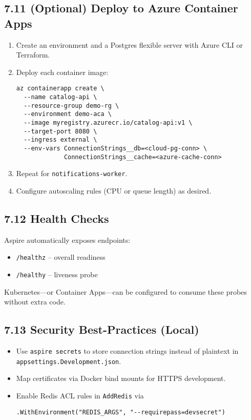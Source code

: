 \documentclass[table]{article}
\begin{document}
\subsection*{7.11 \faGlobe\enspace (Optional) Deploy to Azure Container Apps}
\begin{enumerate}
  \item Create an environment and a Postgres flexible server with
        Azure CLI or Terraform.
  \item Deploy each container image:
\begin{verbatim}
az containerapp create \
  --name catalog-api \
  --resource-group demo-rg \
  --environment demo-aca \
  --image myregistry.azurecr.io/catalog-api:v1 \
  --target-port 8080 \
  --ingress external \
  --env-vars ConnectionStrings__db=<cloud-pg-conn> \
             ConnectionStrings__cache=<azure-cache-conn>
\end{verbatim}
  \item Repeat for \texttt{notifications-worker}.  
  \item Configure autoscaling rules (CPU or queue length) as desired.
\end{enumerate}

\subsection*{7.12 \faHeartbeat\enspace Health Checks}
Aspire automatically exposes endpoints:
\begin{itemize}
  \item \verb|/healthz| – overall readiness
  \item \verb|/healthy| – liveness probe
\end{itemize}
Kubernetes—or Container Apps—can be configured to consume these probes
without extra code.

\subsection*{7.13 \faCubes\enspace Security Best-Practices (Local)}
\begin{itemize}
  \item Use \verb|aspire secrets| to store connection strings instead
        of plaintext in \verb|appsettings.Development.json|.
  \item Map certificates via Docker bind mounts for HTTPS development.
  \item Enable Redis ACL rules in \verb|AddRedis| via
\begin{verbatim}
.WithEnvironment("REDIS_ARGS", "--requirepass=devsecret")
\end{verbatim}
\end{itemize}
\end{document}
